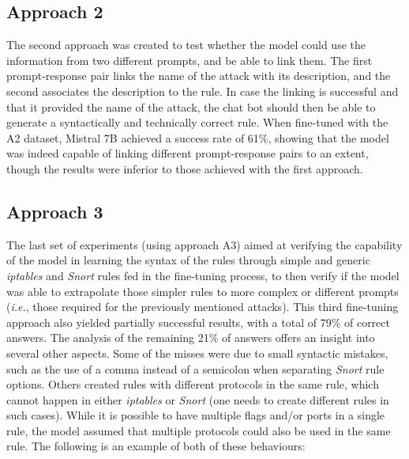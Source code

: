 \documentclass[sigconf]{acmart}
\begin{document}
\subsection{Approach 2}
The second approach was created to test whether the model could use the information from two different prompts, and be able to link them. The first prompt-response pair links the name of the attack with its description, and the second associates the description to the rule. In case the linking is successful and that it provided the name of the attack, the chat bot should then be able to generate a syntactically and technically correct rule. When fine-tuned with the A2 dataset, Mistral 7B achieved a success rate of 61\%, showing that the model was indeed capable of linking different prompt-response pairs to an extent, though the results were inferior to those achieved with the first approach.

\subsection{Approach 3}
The last set of experiments (using approach A3) aimed at verifying the capability of the model in learning the syntax of the rules through simple and generic \textit{iptables} and \textit{Snort} rules fed in the fine-tuning process, to then verify if the model was able to extrapolate those simpler rules to more complex or different prompts (\textit{i.e.}, those required for the previously mentioned attacks). This third fine-tuning approach also yielded partially successful results, with a total of 79\% of correct answers. The analysis of the remaining 21\% of answers offers an insight into several other aspects. Some of the misses were due to small syntactic mistakes, such as the use of a comma instead of a semicolon when separating \textit{Snort} rule options. Others created rules with different protocols in the same rule, which cannot happen in either \textit{iptables} or \textit{Snort} (one needs to create different rules in such cases). While it is possible to have multiple flags and/or ports in a single rule, the model assumed that multiple protocols could also be used in the same rule. The following is an example of both of these behaviours:
\end{document}

